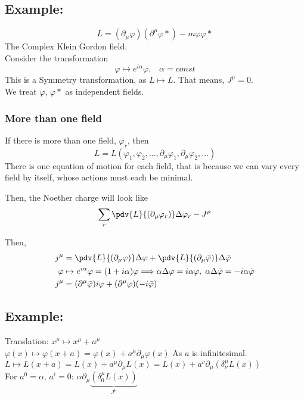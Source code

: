 \documentclass[]{scrartcl}
\begin{document}
\subsection{Example:}
\begin{equation}
	L = (\partial_\mu\varphi)(\partial^\mu\varphi*) - m\varphi\varphi*
\end{equation}
The Complex Klein Gordon field.\\
Consider the transformation
\begin{equation}
	\varphi\mapsto e^{i\alpha}\varphi,\;\;\; \alpha=const
\end{equation}
This is a Symmetry transformation, as $L \mapsto L$. That means, $J^\mu = 0$.\\
We treat $\varphi,\,\varphi*$ as independent fields. 

\subsubsection{More than one field}
If there is more than one field, $\varphi_r$, then
\begin{equation}
	L = L(\varphi_1, \varphi_2,..., \partial_\mu\varphi_1, \partial_\mu\varphi_2,...)
\end{equation}
There is one equation of motion for each field, that is because we can vary every field by itself, whose actions must each be minimal.

Then, the Noether charge will look like
\begin{equation}
	\sum_r \pdv{L}{(\partial_\mu\varphi_r)}\Delta\varphi_r - J^\mu
\end{equation}

Then,
\begin{align}
	j^\mu &= \pdv{L}{(\partial_\mu\varphi)}\Delta\varphi + \pdv{L}{(\partial_\mu\bar\varphi)}\Delta\bar\varphi\\
	\varphi &\mapsto e^{i\alpha}\varphi = (1+i\alpha)\varphi \Longrightarrow \alpha\Delta\varphi = i\alpha\varphi,\; \alpha\Delta\bar\varphi = -i\alpha\bar\varphi\\
	j^\mu &= (\partial^\mu\bar\varphi)i\varphi + (\partial^\mu\varphi)(-i\bar\varphi)
\end{align}

\subsection{Example:}
Translation: $x^\mu \mapsto x^\mu + a^\mu$\\
$\varphi(x) \mapsto \varphi(x+a) = \varphi(x) + a^\mu\partial_\mu\varphi(x)$ As $a$ is infinitesimal.\\
$L \mapsto L(x + a) = L(x) + a^\mu\partial_\mu L(x) = L(x) + a^\nu\partial_\mu(\delta^\mu_\nu L(x))$\\
For $a^0 = \alpha,\,a^i=0$:	$\alpha\partial_\mu\underbrace{(\delta^\mu_0 L(x))}_{J^\mu}$
\end{document}
